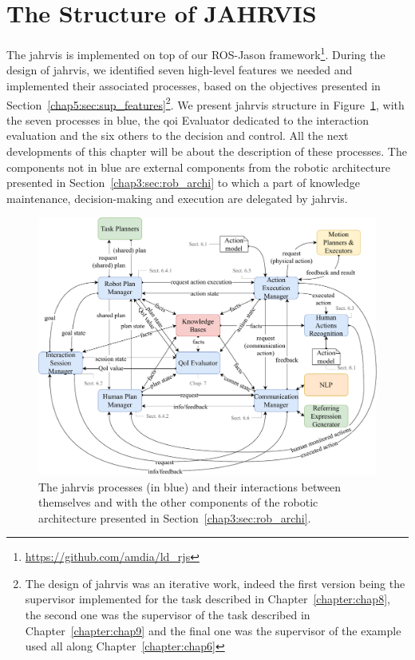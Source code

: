 \documentclass[a4paper,11pt,twoside]{StyleThese}
\begin{document}
\section{The Structure of JAHRVIS}\label{chap5:sec:jahrvis}
The \acrfull{jahrvis} is implemented on top of our ROS-Jason framework\footnote{\url{https://github.com/amdia/ld_rjs}}. During the design of \acrshort{jahrvis}, we identified seven high-level features we needed and implemented their associated processes, based on the objectives presented in Section~\ref{chap5:sec:sup_features}\footnote{The design of \acrshort{jahrvis} was an iterative work, indeed the first version being the supervisor implemented for the task described in Chapter~\ref{chapter:chap8}, the second one was the supervisor of the task described in Chapter~\ref{chapter:chap9} and the final one was the supervisor of the example used all along Chapter~\ref{chapter:chap6}}. We present \acrshort{jahrvis} structure in Figure~\ref{chap5:fig:sup_overview}, with the seven processes in blue, the \acrshort{qoi} Evaluator dedicated to the interaction evaluation and the six others to the decision and control. All the next developments of this chapter will be about the description of these processes. The components not in blue are external components from the robotic architecture presented in Section~\ref{chap3:sec:rob_archi} to which a part of knowledge maintenance, decision-making and execution are delegated by \acrshort{jahrvis}.

\begin{figure}[!ht]
	\includegraphics[width=\linewidth]{figures/chapter2/supervisor_modules.pdf}
	\caption{The \acrshort{jahrvis} processes (in blue) and their interactions between themselves and with the other components of the robotic architecture presented in Section~\ref{chap3:sec:rob_archi}.}
	\label{chap5:fig:sup_overview}
\end{figure}
\end{document}

